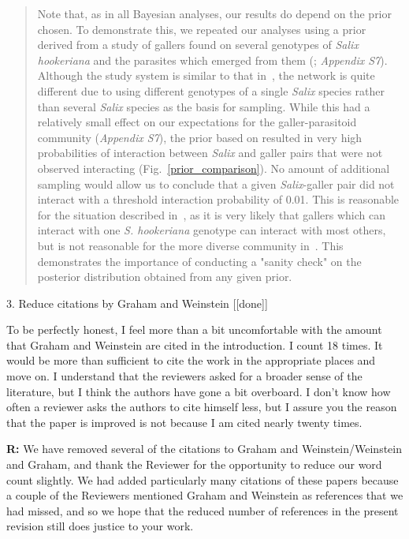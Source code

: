 \documentclass[12pt]{letter}
\newenvironment{refquote}{\bigskip \begin{it}}{\end{it}\smallskip}
\begin{document}
		\begin{quotation}

		  Note that, as in all Bayesian analyses, our results do depend on the prior chosen. To demonstrate this, we repeated our analyses using a prior derived from a study of gallers found on several genotypes of \emph{Salix hookeriana} and the parasites which emerged from them (\citealp{Barbour2016,Barbour2016Dryad}; \emph{Appendix S7}). Although the study system is similar to that in~\citet{Kopelke2017}, the network is quite different due to using different genotypes of a single \emph{Salix} species rather than several \emph{Salix} species as the basis for sampling. While this had a relatively small effect on our expectations for the galler-parasitoid community (\emph{Appendix S7}), the prior based on \citep{Barbour2016} resulted in very high probabilities of interaction between \emph{Salix} and galler pairs that were not observed interacting (Fig.~\ref{prior_comparison}). No amount of additional sampling would allow us to conclude that a given \emph{Salix}-galler pair did not interact with a threshold interaction probability of 0.01. This is reasonable for the situation described in~\citet{Barbour2016}, as it is very likely that gallers which can interact with one \emph{S. hookeriana} genotype can interact with most others, but is not reasonable for the more diverse community in~\citet{Kopelke2017}. This demonstrates the importance of conducting a "sanity check" on the posterior distribution obtained from any given prior.

		\end{quotation}



	3. Reduce citations by Graham and Weinstein [[done]]

		\begin{refquote}

			To be perfectly honest, I feel more than a bit uncomfortable with the amount that Graham and Weinstein are cited in the introduction. I count 18 times. It would be more than sufficient to cite the work in the appropriate places and move on. I understand that the reviewers asked for a broader sense of the literature, but I think the authors have gone a bit overboard. I don’t know how often a reviewer asks the authors to cite himself less, but I assure you the reason that the paper is improved is not because I am cited nearly twenty times.


		\end{refquote}

		\textbf{R:} We have removed several of the citations to Graham and Weinstein/Weinstein and Graham, and thank the Reviewer for the opportunity to reduce our word count slightly. We had added particularly many citations of these papers because a couple of the Reviewers mentioned Graham and Weinstein as references that we had missed, and so we hope that the reduced number of references in the present revision still does justice to your work.



\clearpage

     
\end{document}
